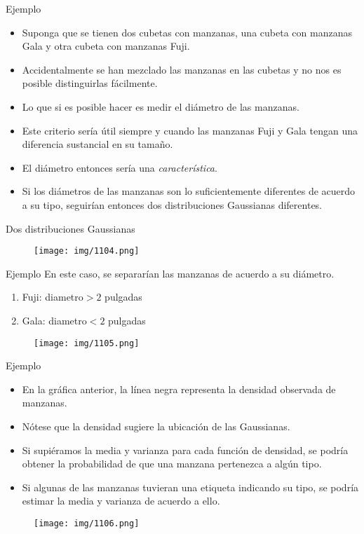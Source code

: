 \documentclass[11pt,aspectratio=169]{beamer}
\begin{document}
\begin{frame}{Ejemplo}
\begin{itemize}
	\item Suponga que se tienen dos cubetas con manzanas, una cubeta con manzanas Gala y otra cubeta con manzanas Fuji.\pause
	\item Accidentalmente se han mezclado las manzanas en las cubetas y no nos es posible distinguirlas fácilmente.\pause
	\item Lo que si es posible hacer es medir el diámetro de las manzanas.\pause
	\item Este criterio sería útil siempre y cuando las manzanas Fuji y Gala tengan una diferencia sustancial en su tamaño.\pause
	\item El diámetro entonces sería una \textit{característica}.\pause
	\item Si los diámetros de las manzanas son lo suficientemente diferentes de acuerdo a su tipo, seguirían entonces dos 
		distribuciones Gaussianas diferentes.
\end{itemize}

\end{frame}

\begin{frame}{Dos distribuciones Gaussianas}
\begin{figure}[H]
	\centering
	\texttt{[image: img/1104.png]}
\end{figure}
\end{frame}

\begin{frame}{Ejemplo}
En este caso, se separarían las manzanas de acuerdo a su diámetro.\pause
\begin{enumerate}
	\item Fuji: diametro$>2$ pulgadas
	\item Gala: diametro$<2$ pulgadas\pause
\end{enumerate}
\begin{figure}[H]
	\centering
	\texttt{[image: img/1105.png]}
\end{figure}
\end{frame}

\begin{frame}{Ejemplo}
\begin{itemize}
	\item En la gráfica anterior, la línea negra representa la densidad observada de manzanas.\pause
	\item Nótese que la densidad sugiere la ubicación de las Gaussianas.\pause
	\item Si supiéramos la media y varianza para cada función de densidad, se podría obtener la probabilidad
		de que una manzana pertenezca a algún tipo.\pause
	\item Si algunas de las manzanas tuvieran una etiqueta indicando su tipo, se podría estimar la media y varianza 
		de acuerdo a ello.\pause
\end{itemize}
\begin{figure}[H]
	\centering
	\texttt{[image: img/1106.png]}
\end{figure}
\end{frame}
\end{document}
